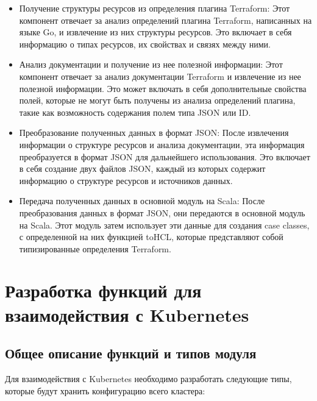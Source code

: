 \begin{itemize}
  \item Получение структуры ресурсов из определения плагина Terraform:
Этот компонент отвечает за анализ определений плагина Terraform, написанных на
языке Go, и извлечение из них структуры ресурсов. Это включает в себя информацию
о типах ресурсов, их свойствах и связях между ними.
  
  \item Анализ документации и получение из нее полезной информации:
Этот компонент отвечает за анализ документации Terraform и извлечение из нее
полезной информации. Это может включать в себя дополнительные свойства полей,
которые не могут быть получены из анализа определений плагина, такие как
возможность содержания полем типа JSON или ID.
  
  \item Преобразование полученных данных в формат JSON: После
извлечения информации о структуре ресурсов и анализа документации, эта
информация преобразуется в формат JSON для дальнейшего использования. Это
включает в себя создание двух файлов JSON, каждый из которых содержит информацию
о структуре ресурсов и источников данных.
  
  \item Передача полученных данных в основной модуль на Scala: После
преобразования данных в формат JSON, они передаются в основной модуль на Scala.
Этот модуль затем использует эти данные для создания case classes, с
определенной на них функцией toHCL, которые представляют собой типизированные
определения Terraform.
\end{itemize}

\section{Разработка функций для взаимодействия с Kubernetes}

\subsection{Общее описание функций и типов модуля}

Для взаимодействия с Kubernetes необходимо разработать следующие типы, которые
будут хранить конфигурацию всего кластера:

